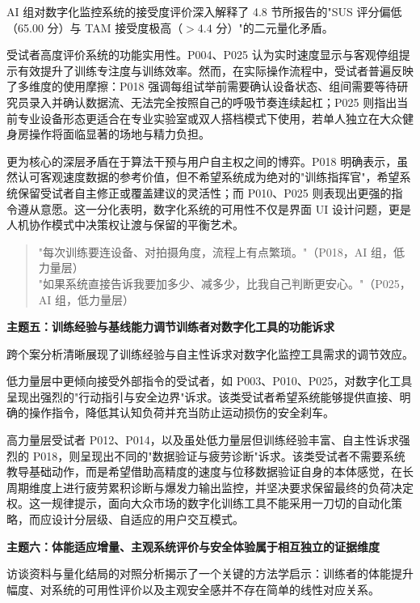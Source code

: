 \documentclass[UTF8,zihao=-4,twoside,openany]{ctexbook}
\begin{document}
AI 组对数字化监控系统的接受度评价深入解释了 4.8 节所报告的"SUS 评分偏低（65.00 分）与 TAM 接受度极高（$>4.4$ 分）"的二元量化矛盾。

受试者高度评价系统的功能实用性。P004、P025 认为实时速度显示与客观停组提示有效提升了训练专注度与训练效率。然而，在实际操作流程中，受试者普遍反映了多维度的使用摩擦：P018 强调每组试举前需要确认设备状态、组间需要等待研究员录入并确认数据流、无法完全按照自己的呼吸节奏连续起杠；P025 则指出当前专业设备形态更适合在专业实验室或双人搭档模式下使用，若单人独立在大众健身房操作将面临显著的场地与精力负担。

更为核心的深层矛盾在于算法干预与用户自主权之间的博弈。P018 明确表示，虽然认可客观速度数据的参考价值，但不希望系统成为绝对的"训练指挥官"，希望系统保留受试者自主修正或覆盖建议的灵活性；而 P010、P025 则表现出更强的指令遵从意愿。这一分化表明，数字化系统的可用性不仅是界面 UI 设计问题，更是人机协作模式中决策权让渡与保留的平衡艺术。

\begin{quote}
  \kaishu\fontsize{10.5pt}{16pt}\selectfont
  "每次训练要连设备、对拍摄角度，流程上有点繁琐。"（P018，AI 组，低力量层） \\[0.2cm]
  "如果系统直接告诉我要加多少、减多少，比我自己判断更安心。"（P025，AI 组，低力量层）
\end{quote}

\vspace{0.3cm}
\noindent \textbf{主题五：训练经验与基线能力调节训练者对数字化工具的功能诉求}

跨个案分析清晰展现了训练经验与自主性诉求对数字化监控工具需求的调节效应。

低力量层中更倾向接受外部指令的受试者，如 P003、P010、P025，对数字化工具呈现出强烈的"行动指引与安全边界"诉求。该类受试者希望系统能够提供直接、明确的操作指令，降低其认知负荷并充当防止运动损伤的安全刹车。

高力量层受试者 P012、P014，以及虽处低力量层但训练经验丰富、自主性诉求强烈的 P018，则呈现出不同的"数据验证与疲劳诊断"诉求。该类受试者不需要系统教导基础动作，而是希望借助高精度的速度与位移数据验证自身的本体感觉，在长周期维度上进行疲劳累积诊断与爆发力输出监控，并坚决要求保留最终的负荷决定权。这一规律提示，面向大众市场的数字化训练工具不能采用一刀切的自动化策略，而应设计分层级、自适应的用户交互模式。

\vspace{0.3cm}
\noindent \textbf{主题六：体能适应增量、主观系统评价与安全体验属于相互独立的证据维度}

访谈资料与量化结局的对照分析揭示了一个关键的方法学启示：训练者的体能提升幅度、对系统的可用性评价以及主观安全感并不存在简单的线性对应关系。
\end{document}
